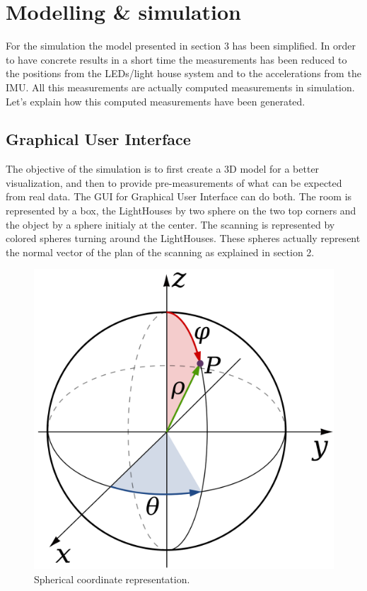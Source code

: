 \documentclass{vldb}
\begin{document}
\section{Modelling \& simulation}
\label{Sim}



For the simulation the model presented in section 3 has been simplified. In order to have concrete results in a short time the measurements has been reduced to the positions from the LEDs/light house system and to the accelerations from the IMU. All this measurements are actually computed measurements in simulation. Let's explain how this computed measurements have been generated.

\subsection{Graphical User Interface}
\label{GUI}
The objective of the simulation is to first create a 3D model for a better visualization, and then to provide pre-measurements of what can be expected from real data. The GUI for Graphical User Interface can do both. The room is represented by a box, the LightHouses by two sphere on the two top corners and the object by a sphere initialy at the center. The scanning is represented by colored spheres turning around the LightHouses. These spheres actually represent the normal vector of the plan of the scanning as explained in section 2. \newline
\begin{figure}
\centering
    \includegraphics[height=0.4\textheight]{Image/sphere.png}
    \caption{Spherical coordinate representation.}
    \label{SC1}
\end{figure}
\end{document}
